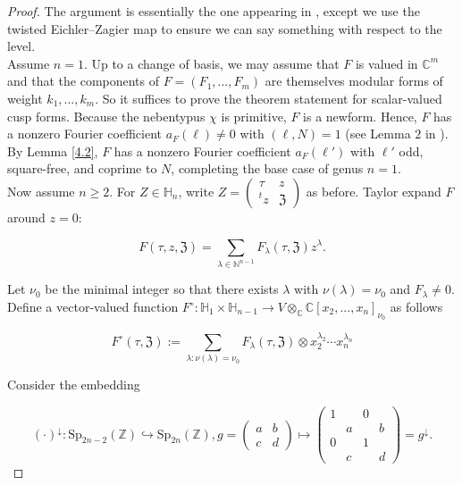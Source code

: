 \documentclass[11pt]{article}
\theoremstyle{definition}
\theoremstyle{remark}
\newcommand{\C}{\mathbb{C}}
\newcommand{\Z}{\mathbb{Z}}
\newcommand{\h}{\mathbb{H}}
\newcommand{\N}{\mathbb{N}}
\begin{document}
\begin{proof}

The argument is essentially the one appearing in \cite{BD}, except we use the twisted Eichler--Zagier map to ensure we can say something with respect to the level. \\

Assume $n = 1$. Up to a change of basis, we may assume that $F$ is valued in $\C^m$ and that the components of $F = (F_1,...,F_m)$ are themselves modular forms of weight $k_1,...,k_m$. So it suffices to prove the theorem statement for scalar-valued cusp forms. Because the nebentypus $\chi$ is primitive, $F$ is a newform. Hence, $F$ has a nonzero Fourier coefficient $a_F(\ell) \neq 0$ with $(\ell, N) = 1$ (see Lemma $2$ in \cite{Yamana}). By Lemma \ref{4.2}, $F$ has a nonzero Fourier coefficient $a_F(\ell')$ with $\ell'$ odd, square-free, and coprime to $N$, completing the base case of genus $n = 1$. \\

Now assume $n \geq 2$. For $Z \in \mathbb{H}_n$, write $Z = \begin{pmatrix} \tau & z \\ ^t z & \mathfrak{Z} \end{pmatrix}$ as before. Taylor expand $F$ around $z = 0$:

\[
F(\tau, z, \mathfrak{Z}) = \sum_{\lambda \in \N^{n-1}} F_\lambda(\tau, \mathfrak{Z}) z^\lambda.
\]

Let $\nu_0$ be the minimal integer so that there exists $\lambda$ with $\nu(\lambda) = \nu_0$ and $F_{\lambda} \neq 0$. Define a vector-valued function $F^{\circ}:\h_1 \times \h_{n-1} \to V \otimes_\C \C[x_2,...,x_n]_{\nu_0}$ as follows

\[
F^{\circ}(\tau,\mathfrak{Z}) := \sum_{\lambda: \nu(\lambda) = \nu_0} F_\lambda(\tau,\mathfrak{Z}) \otimes x_2^{\lambda_2} \cdots x_n^{\lambda_n}
\]

Consider the embedding 

\[
(\cdot)^{\downarrow}:\text{Sp}_{2n-2}(\Z) \hookrightarrow \text{Sp}_{2n}(\Z), g = \begin{pmatrix} a & b \\ c & d \end{pmatrix} \mapsto \begin{pmatrix} 1 & & 0 & \\ & a & & b \\ 0 & & 1 & \\ & c & & d \end{pmatrix} = g^\downarrow.
\]


\end{proof}
\end{document}
